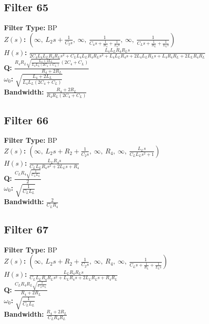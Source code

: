 \documentclass{article}
\begin{document}
\subsection*{Filter 65}
\textbf{Filter Type:} BP \\ 
\textbf{$Z(s)$:} $\left( \infty, \  L_{2} s + \frac{1}{C_{2} s}, \  \infty, \  \frac{1}{C_{4} s + \frac{1}{R_{4}} + \frac{1}{L_{4} s}}, \  \infty, \  \frac{1}{C_{L} s + \frac{1}{R_{L}} + \frac{1}{L_{L} s}}\right)$ \\ 
\textbf{$H(s)$:} $\frac{L_{4} L_{L} R_{4} R_{L} s}{2 C_{4} L_{4} L_{L} R_{4} R_{L} s^{2} + C_{L} L_{4} L_{L} R_{4} R_{L} s^{2} + L_{4} L_{L} R_{4} s + 2 L_{4} L_{L} R_{L} s + L_{4} R_{4} R_{L} + 2 L_{L} R_{4} R_{L}}$ \\ 
\textbf{Q:} $\frac{R_{4} R_{L} \sqrt{\frac{L_{4} + 2 L_{L}}{L_{4} L_{L} \left(2 C_{4} + C_{L}\right)}} \left(2 C_{4} + C_{L}\right)}{R_{4} + 2 R_{L}}$ \\ 
\textbf{$\omega_0$:} $\sqrt{\frac{L_{4} + 2 L_{L}}{L_{4} L_{L} \left(2 C_{4} + C_{L}\right)}}$ \\ 
\textbf{Bandwidth:} $\frac{R_{4} + 2 R_{L}}{R_{4} R_{L} \left(2 C_{4} + C_{L}\right)}$ \\ 
\subsection*{Filter 66}
\textbf{Filter Type:} BP \\ 
\textbf{$Z(s)$:} $\left( \infty, \  L_{2} s + R_{2} + \frac{1}{C_{2} s}, \  \infty, \  R_{4}, \  \infty, \  \frac{L_{L} s}{C_{L} L_{L} s^{2} + 1}\right)$ \\ 
\textbf{$H(s)$:} $\frac{L_{L} R_{4} s}{C_{L} L_{L} R_{4} s^{2} + 2 L_{L} s + R_{4}}$ \\ 
\textbf{Q:} $\frac{C_{L} R_{4} \sqrt{\frac{1}{C_{L} L_{L}}}}{2}$ \\ 
\textbf{$\omega_0$:} $\sqrt{\frac{1}{C_{L} L_{L}}}$ \\ 
\textbf{Bandwidth:} $\frac{2}{C_{L} R_{4}}$ \\ 
\subsection*{Filter 67}
\textbf{Filter Type:} BP \\ 
\textbf{$Z(s)$:} $\left( \infty, \  L_{2} s + R_{2} + \frac{1}{C_{2} s}, \  \infty, \  R_{4}, \  \infty, \  \frac{1}{C_{L} s + \frac{1}{R_{L}} + \frac{1}{L_{L} s}}\right)$ \\ 
\textbf{$H(s)$:} $\frac{L_{L} R_{4} R_{L} s}{C_{L} L_{L} R_{4} R_{L} s^{2} + L_{L} R_{4} s + 2 L_{L} R_{L} s + R_{4} R_{L}}$ \\ 
\textbf{Q:} $\frac{C_{L} R_{4} R_{L} \sqrt{\frac{1}{C_{L} L_{L}}}}{R_{4} + 2 R_{L}}$ \\ 
\textbf{$\omega_0$:} $\sqrt{\frac{1}{C_{L} L_{L}}}$ \\ 
\textbf{Bandwidth:} $\frac{R_{4} + 2 R_{L}}{C_{L} R_{4} R_{L}}$ \\ 
\end{document}
